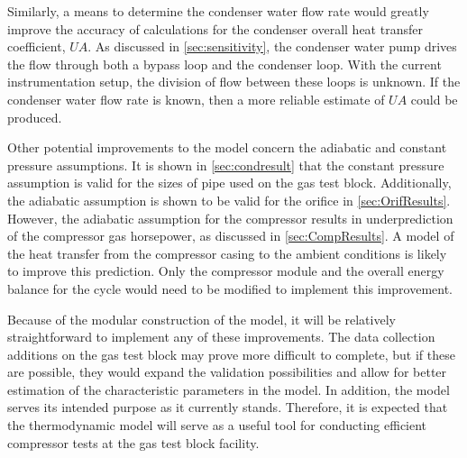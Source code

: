 Similarly, a means to determine the condenser water flow rate would
greatly improve the accuracy of calculations for the condenser overall heat transfer coefficient, $UA$.
As discussed in \cref{sec:sensitivity}, the condenser water pump drives the
flow through both a bypass loop and the condenser loop. With the current instrumentation
setup, the division of flow between these loops is unknown.
If the condenser water flow rate is known, then a more reliable
estimate of $UA$ could be produced.

Other potential improvements to the model concern the adiabatic and constant pressure assumptions.
It is shown in \cref{sec:condresult} that the constant pressure assumption is valid for the sizes
of pipe used on the gas test block.
Additionally, the adiabatic assumption is shown to be valid for the orifice in \cref{sec:OrifResults}.
However, the adiabatic assumption for the compressor results in underprediction of the compressor
gas horsepower, as discussed in \cref{sec:CompResults}.
A model of the heat transfer from the compressor casing to the ambient conditions is likely to
improve this prediction.
Only the compressor module and the overall energy balance 
for the cycle would need to be modified to implement this improvement.

Because of the modular construction of the model, it will be relatively 
straightforward to implement any of these improvements.
The data collection additions on the gas test block may prove more difficult to complete,
but if these are possible, they would expand the validation possibilities 
and allow for better estimation of the characteristic parameters in the model.
In addition, the model serves its intended purpose as it currently stands.
Therefore, it is expected that the thermodynamic model will serve as a useful
tool for conducting efficient compressor tests at the  gas
test block facility.